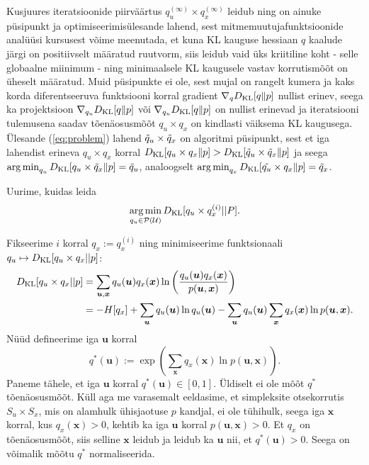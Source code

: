Kusjuures iteratsioonide piirväärtus $q_u^{(\infty)} \times q_x^{(\infty)}$ leidub ning on ainuke püsipunkt ja optimiseerimisülesande lahend, sest mitmemuutujafunktsioonide analüüsi kursusest võime meenutada, et kuna KL kauguse hessiaan $q$ kaalude järgi on positiivselt määratud ruutvorm, siis leidub vaid üks kriitiline koht - selle globaalne miinimum - ning minimaalsele KL kaugusele vastav korrutismõõt on üheselt määratud. Muid püsipunkte ei ole, sest mujal on rangelt kumera ja kaks korda diferentseeruva funktsiooni korral gradient $\nabla_q D_{\mathrm{KL}}[q \| p]$ nullist erinev, seega ka projektsioon $\nabla_{q_u} D_{\mathrm{KL}}[q \| p]$ või $\nabla_{q_u} D_{\mathrm{KL}}[q \| p]$ on nullist erinevad ja iteratsiooni tulemusena saadav tõenäosusmõõt $q_u \times q_x$ on kindlasti väiksema KL kaugusega. Ülesande (\ref{eq:problem}) lahend $\Tilde{q}_u \times \Tilde{q}_x$ on algoritmi püsipunkt, sest et iga lahendist erineva $q_u \times q_x$ korral $D_{\mathrm{KL}}[q_u \times q_x \| p] > D_{\mathrm{KL}}[\Tilde{q}_u \times \Tilde{q}_x \| p]$ ja seega $\operatorname*{arg\,min}_{q_u} D_{\mathrm{KL}}[q_u \times \Tilde{q}_x \| p] = \Tilde{q}_u$, analoogselt $\operatorname*{arg\,min}_{q_x} D_{\mathrm{KL}}[\Tilde{q_u} \times q_x \| p] = \Tilde{q}_x$.


Uurime, kuidas leida $$ \operatorname*{arg\,min}_{q_u \in \mathcal{P}(\mathcal{U})} D_{\mathrm{KL}}[q_u \times q_x^{(i)} || P]. $$


Fikseerime $i$ korral $q_x := q_x^{(i)}$ ning minimiseerime funktsionaali $q_u \mapsto D_{\mathrm{KL}}[q_u \times q_x || p]$:
\begin{align*}
     D_{\mathrm{KL}}[q_u \times q_x || p] &= \sum_{\bm{u},\bm{x}} q_u(\bm{u}) q_x(\bm{x}) \ln\left( \frac{q_u(\bm{u}) q_x(\bm{x})}{p(\bm{u},\bm{x})} \right) \\
     &= -H[q_x] + \sum_{\bm{u}}q_u(\bm{u}) \ln q_u(\bm{u}) - \sum_{\bm{u}}q_u(\bm{u})\sum_{\bm{x}}q_x(\bm{x})  \ln p(\bm{u},\bm{x}).
\end{align*}
Nüüd defineerime iga $\bm{u}$ korral
$$q^*(\bm{u}) := \exp \left( \sum_{\bm{x}} q_x(\bm{x}) \ln p(\bm{u},\bm{x}) \right).$$
Paneme tähele, et iga $\bm{u}$ korral $q^*(\bm{u}) \in [0,1]$. Üldiselt ei ole mõõt $q^*$ tõenäosusmõõt. Küll aga me varasemalt eeldasime, et simpleksite otsekorrutis $S_u \times S_x$, mis on alamhulk ühisjaotuse $p$ kandjal, ei ole tühihulk, seega iga $\bm{x}$ korral, kus $q_x(\bm{x}) > 0$, kehtib ka iga $\bm{u}$ korral $p(\bm{u}, \bm{x}) > 0$. Et $q_x$ on tõenäosusmõõt, siis selline $\bm{x}$ leidub ja leidub ka $\bm{u}$ nii, et $q^*(\bm{u}) > 0$. Seega on võimalik mõõtu $q^*$ normaliseerida.


